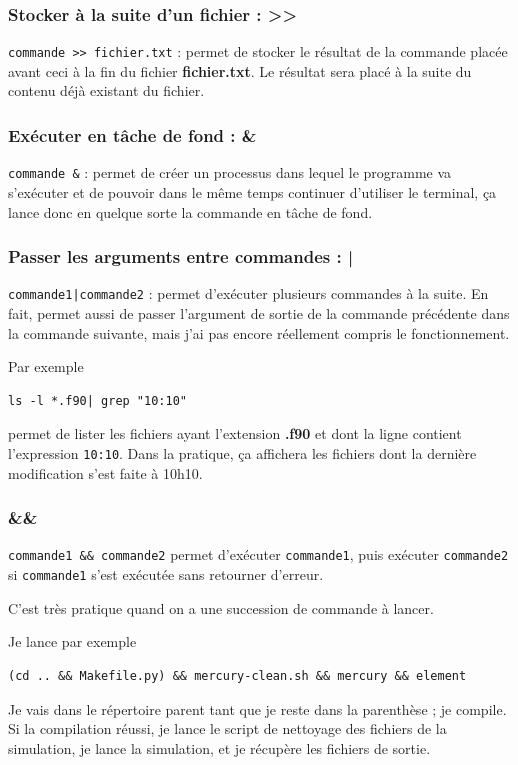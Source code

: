 \documentclass[a4paper,twoside]{article}
\begin{document}
\subsubsection{Stocker à la suite d'un fichier : >>}
\verb|commande >> fichier.txt| : permet de stocker le résultat de la commande placée avant ceci à la fin du fichier \textbf{fichier.txt}. Le résultat sera placé à la suite du contenu déjà existant du fichier.

\subsubsection{Exécuter en tâche de fond : \&}
\verb|commande &| : permet de créer un processus dans lequel le programme va s'exécuter et de pouvoir dans le même temps continuer d'utiliser le terminal, ça lance donc en quelque sorte la commande en tâche de fond.

\subsubsection{Passer les arguments entre commandes : |}
\verb#commande1|commande2# : permet d'exécuter plusieurs commandes à la suite. En fait, permet aussi de passer l'argument de sortie de la commande précédente dans la commande suivante, mais j'ai pas encore réellement compris le fonctionnement.

Par exemple 
\begin{verbatim}
ls -l *.f90| grep "10:10"
\end{verbatim}
permet de lister les fichiers ayant l'extension \textbf{.f90} et dont la ligne contient l'expression \texttt{10:10}. Dans la pratique, ça affichera les fichiers dont la dernière modification s'est faite à 10h10. 


\subsubsection{\&\&}
\verb|commande1 && commande2| permet d'exécuter \texttt{commande1}, puis exécuter \texttt{commande2} si \texttt{commande1} s'est exécutée sans retourner d'erreur.

C'est très pratique quand on a une succession de commande à lancer. 

Je lance par exemple 
\begin{verbatim}
(cd .. && Makefile.py) && mercury-clean.sh && mercury && element
\end{verbatim}
Je vais dans le répertoire parent tant que je reste dans la parenthèse ;  je compile. Si la compilation réussi, je lance le script de nettoyage des fichiers de la simulation, je lance la simulation, et je récupère les fichiers de sortie.
\end{document}
